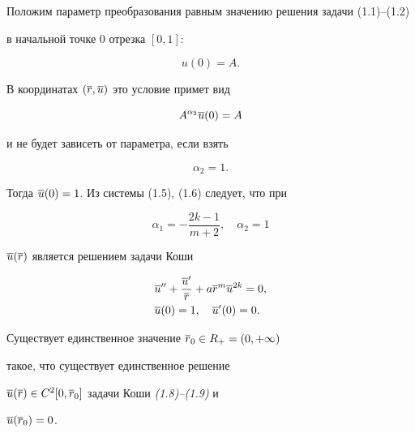 Положим параметр преобразования равным значению решения задачи (1.1)--(1.2) 


в начальной точке 0 отрезка $[0,1]$: 


$$ 


u(0)=A. 


$$ 


В координатах $(\overline r,\overline u)$ это условие примет вид 


$$ 


A^{\alpha_2}\ovl u(0)=A 


$$ 


и не будет зависеть от параметра, если взять 


\begin{equation} 


\alpha_2=1. 


\end{equation} 


Тогда $\overline u(0)=1$. Из системы (1.5), (1.6) следует, что при 


\begin{equation} 


\alpha_1=-\frac{2k-1}{m+2},\quad \alpha_2=1 


\end{equation} 


$\overline u(\overline r)$ является решением задачи Коши 


\begin{align} 


& \ovl u''+\frac{\ovl u'}{\ovl r}+a\ovl r^m\ovl u^{2k}=0,\\ 


& \ovl u(0)=1,\quad \ovl u'(0)=0. 


\end{align} 


 


\begin{lem} Существует единственное значение $\overline r_0\in R_+=(0,+\infty)$ 


такое, что существует единственное решение 


$\overline u(\overline r)\in C^2[0,\overline r_0]$ задачи Коши {\em (1.8)--(1.9)} и 


$\overline u(\overline r_0)=0$. 


\end{lem} 


 



